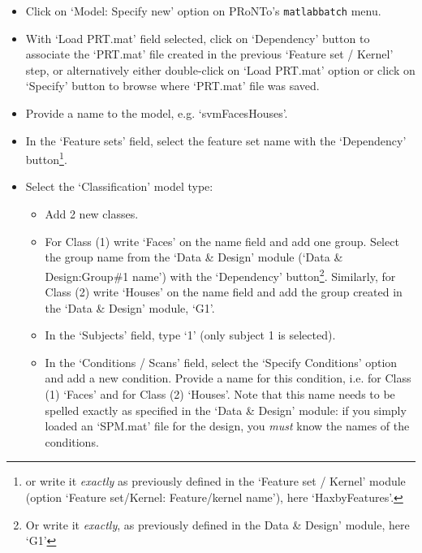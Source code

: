 \begin{itemize}

\item Click on `Model: Specify new' option on PRoNTo's {\tt matlabbatch} menu.
	
	\item With `Load PRT.mat' field selected, click on `Dependency' button to associate the `PRT.mat' file created in the previous `Feature set / Kernel' step, or alternatively either double-click on `Load PRT.mat' option or click on `Specify' button to browse where `PRT.mat' file was saved.

	\item Provide a name to the model, e.g. `svmFacesHouses'. 
	
	\item In the `Feature sets' field, select the feature set name with the `Dependency' button\footnote{or write it {\it exactly} as previously defined in the `Feature set / Kernel' module (option `Feature set/Kernel: Feature/kernel name'), here `HaxbyFeatures'.}.
	
	\item Select the `Classification' model type:
	
		\begin{itemize}
		
		\item Add 2 new classes.
		
		\item For Class (1) write `Faces' on the name field and add one group. Select the group name from the `Data \& Design' module (`Data \& Design:Group\#1 name') with the `Dependency' button\footnote{Or write it {\it exactly}, as previously defined in the Data \& Design' module, here `G1'}. Similarly, for Class (2) write `Houses' on the name field and add the group created in the `Data \& Design' module, `G1'.	
		
		\item In the `Subjects' field, type `1' (only subject 1 is selected).
		
		\item In the `Conditions / Scans' field, select the `Specify Conditions' option and add a new condition. Provide a name for this condition, i.e. for Class (1) `Faces' and for Class (2) `Houses'. Note that this name needs to be spelled exactly as specified in the `Data \& Design' module: if you simply loaded an `SPM.mat' file for the design, you {\it must} know the names of the conditions.
		

		\end{itemize}			
	

\end{itemize}
